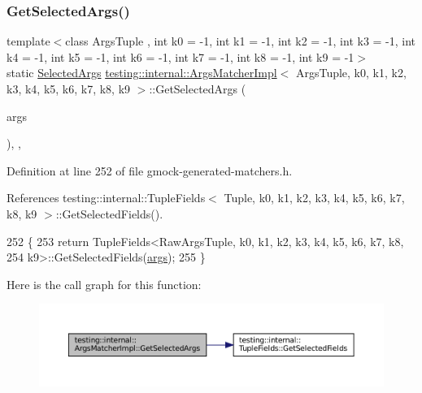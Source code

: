\subsubsection{\texorpdfstring{Get\+Selected\+Args()}{GetSelectedArgs()}}
{\footnotesize\ttfamily template$<$class Args\+Tuple , int k0 = -\/1, int k1 = -\/1, int k2 = -\/1, int k3 = -\/1, int k4 = -\/1, int k5 = -\/1, int k6 = -\/1, int k7 = -\/1, int k8 = -\/1, int k9 = -\/1$>$ \\
static \hyperlink{classtesting_1_1internal_1_1ArgsMatcherImpl_ab061679f6251e56ccbedaf0c316d00ff}{Selected\+Args} \hyperlink{classtesting_1_1internal_1_1ArgsMatcherImpl}{testing\+::internal\+::\+Args\+Matcher\+Impl}$<$ Args\+Tuple, k0, k1, k2, k3, k4, k5, k6, k7, k8, k9 $>$\+::Get\+Selected\+Args (\begin{DoxyParamCaption}\item[{Args\+Tuple}]{args }\end{DoxyParamCaption})\hspace{0.3cm}{\ttfamily [inline]}, {\ttfamily [static]}, {\ttfamily [private]}}



Definition at line 252 of file gmock-\/generated-\/matchers.\+h.



References testing\+::internal\+::\+Tuple\+Fields$<$ Tuple, k0, k1, k2, k3, k4, k5, k6, k7, k8, k9 $>$\+::\+Get\+Selected\+Fields().


\begin{DoxyCode}
252                                                       \{
253     \textcolor{keywordflow}{return} TupleFields<RawArgsTuple, k0, k1, k2, k3, k4, k5, k6, k7, k8,
254         k9>::GetSelectedFields(\hyperlink{namespacegenerate__debs_a75f9143e38df82d83b2e8a6f99cae02c}{args});
255   \}
\end{DoxyCode}
Here is the call graph for this function\+:
\nopagebreak
\begin{figure}[H]
\begin{center}
\leavevmode
\includegraphics[width=350pt]{classtesting_1_1internal_1_1ArgsMatcherImpl_a168a7d6a82bd20fd6b1c777ab64c34a5_cgraph}
\end{center}
\end{figure}
\mbox{\label{classtesting_1_1internal_1_1ArgsMatcherImpl_a6ef9d2868258271039d001e20f5f7fb2}} 
